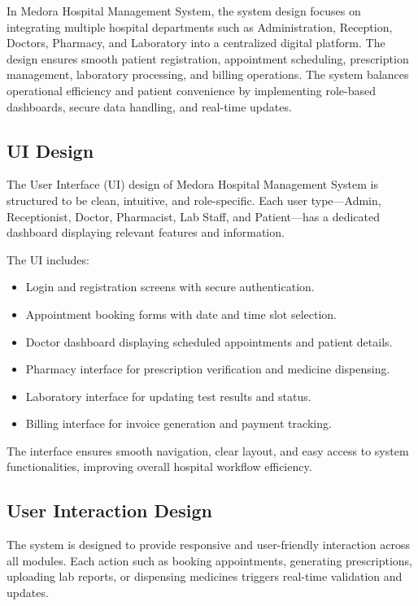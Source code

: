 In Medora Hospital Management System, the system design focuses on integrating multiple hospital departments such as Administration, Reception, Doctors, Pharmacy, and Laboratory into a centralized digital platform. The design ensures smooth patient registration, appointment scheduling, prescription management, laboratory processing, and billing operations. The system balances operational efficiency and patient convenience by implementing role-based dashboards, secure data handling, and real-time updates.

\subsection{UI Design}

The User Interface (UI) design of Medora Hospital Management System is structured to be clean, intuitive, and role-specific. Each user type—Admin, Receptionist, Doctor, Pharmacist, Lab Staff, and Patient—has a dedicated dashboard displaying relevant features and information.

The UI includes:
\begin{itemize}
    \item Login and registration screens with secure authentication.
    \item Appointment booking forms with date and time slot selection.
    \item Doctor dashboard displaying scheduled appointments and patient details.
    \item Pharmacy interface for prescription verification and medicine dispensing.
    \item Laboratory interface for updating test results and status.
    \item Billing interface for invoice generation and payment tracking.
\end{itemize}

The interface ensures smooth navigation, clear layout, and easy access to system functionalities, improving overall hospital workflow efficiency.

\subsection{User Interaction Design}

The system is designed to provide responsive and user-friendly interaction across all modules. Each action such as booking appointments, generating prescriptions, uploading lab reports, or dispensing medicines triggers real-time validation and updates.

